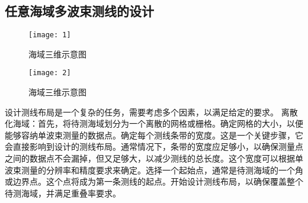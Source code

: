 \documentclass[11pt,twoside,a4paper]{article}
\begin{document}
\subsection{任意海域多波束测线的设计}

\begin{figure}[h]
	\centering
	\texttt{[image: 1]}
	\caption{海域三维示意图}
	
\end{figure}

\begin{figure}[h]
	\centering
	\texttt{[image: 2]}
	\caption{海域三维示意图}
	
\end{figure}
设计测线布局是一个复杂的任务，需要考虑多个因素，以满足给定的要求。
离散化海域：首先，将待测海域划分为一个离散的网格或栅格。确定网格的大小，以便能够容纳单波束测量的数据点。确定每个测线条带的宽度。这是一个关键步骤，它会直接影响到设计的测线布局。通常情况下，条带的宽度应足够小，以确保测量点之间的数据点不会漏掉，但又足够大，以减少测线的总长度。这个宽度可以根据单波束测量的分辨率和精度要求来确定。选择一个起始点，通常是待测海域的一个角或边界点。这个点将成为第一条测线的起点。开始设计测线布局，以确保覆盖整个待测海域，并满足重叠率要求。 
\end{document}
